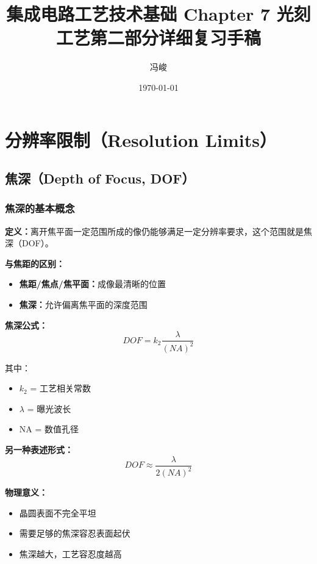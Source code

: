 \documentclass[UTF8,12pt,a4paper]{ctexart}
\title{集成电路工艺技术基础 Chapter 7 光刻工艺第二部分详细复习手稿}
\author{冯峻}
\date{\today}
\begin{document}
\maketitle
\tableofcontents
\newpage

\section{分辨率限制（Resolution Limits）}

\subsection{焦深（Depth of Focus, DOF）}

\subsubsection{焦深的基本概念}

\textbf{定义：}离开焦平面一定范围所成的像仍能够满足一定分辨率要求，这个范围就是焦深（DOF）。

\textbf{与焦距的区别：}
\begin{itemize}
    \item \textbf{焦距/焦点/焦平面：}成像最清晰的位置
    \item \textbf{焦深：}允许偏离焦平面的深度范围
\end{itemize}

\textbf{焦深公式：}
\begin{equation}
DOF = k_2 \frac{\lambda}{(NA)^2}
\end{equation}

其中：
\begin{itemize}
    \item $k_2$ = 工艺相关常数
    \item $\lambda$ = 曝光波长
    \item NA = 数值孔径
\end{itemize}

\textbf{另一种表述形式：}
\begin{equation}
DOF \approx \frac{\lambda}{2(NA)^2}
\end{equation}

\textbf{物理意义：}
\begin{itemize}
    \item 晶圆表面不完全平坦
    \item 需要足够的焦深容忍表面起伏
    \item 焦深越大，工艺容忍度越高
\end{itemize}
\end{document}
